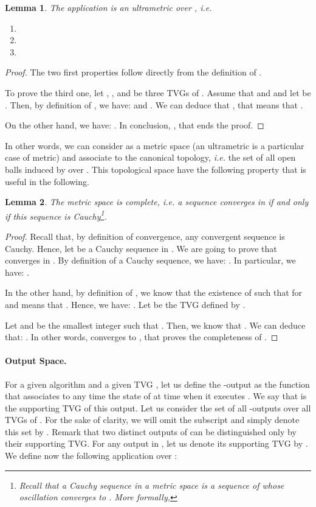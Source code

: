 \documentclass[11pt]{article}
\newtheorem{lemma}{Lemma}
\begin{document}
\begin{lemma}\label{lem:dgultrametric}
The application  is an ultrametric over , \emph{i.e.}
\begin{enumerate}
\item 
\item 
\item 
\end{enumerate}
\end{lemma} 

\begin{proof}
The two first properties follow directly from the definition of . 

To prove the third one, let , , and  be three TVGs of . Assume that  and  and let be . Then, by definition of , we have:  and . We can deduce that , that means that .

On the other hand, we have: . In conclusion, , that ends the proof.
\end{proof}

In other words, we can consider  as a metric space (an ultrametric is a particular case
of metric) and associate to  the canonical topology, \emph{i.e.} the set of all open
balls induced by  over . This topological space have the following property that is useful
in the following.

\begin{lemma}\label{lem:gcomplete}
The metric space  is complete, \emph{i.e.} a sequence converges in  if and only if this sequence is Cauchy\footnote{Recall that a Cauchy sequence in a metric space  is a sequence  of  whose oscillation converges to . More formally, }.
\end{lemma} 

\begin{proof}
Recall that, by definition of convergence, any convergent sequence is Cauchy. Hence, let  be a Cauchy sequence in . We are going to prove that  converges in . By definition of a Cauchy sequence, we have: . In particular, we have: . 

In the other hand, by definition of , we know that the existence of  such that  for  and  means that . Hence, we have:  . Let  be the TVG defined by .

 Let  and  be the smallest integer such that . Then, we know that . We can deduce that: . In other words,  converges to , that proves the completeness of .
\end{proof}

\paragraph{Output Space.} For a given algorithm  and a given TVG , let us define the -output as the function that associates to any time  the state of  at time  when it executes . We say that  is the supporting TVG of this output. Let us consider the set  of all -outputs over all TVGs  of . For the sake of clarity, we will omit the subscript  and simply denote this set by . Remark that two distinct outputs of  can be distinguished only by their supporting TVG. For any output  in , let us denote its supporting TVG by . We define now the following application  over :
\end{document}

